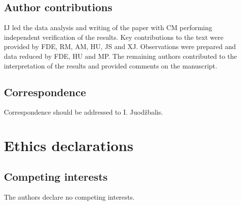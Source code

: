 \documentclass[twocolumn, fleqn]{doc_class}
\begin{document}
\subsection*{Author contributions}
IJ led the data analysis and writing of the paper with CM performing independent verification of the results. Key contributions to the text were provided by FDE, RM, AM, HU, JS and XJ. Observations were prepared and data reduced by FDE, HU and MP. The remaining authors contributed to the interpretation of the results and provided comments on the manuscript.

\subsection*{Correspondence}

Correspondence should be addressed to I. Juodžbalis.

\section*{Ethics declarations}

\subsection*{Competing interests}

The authors declare no competing interests.









\end{document}
